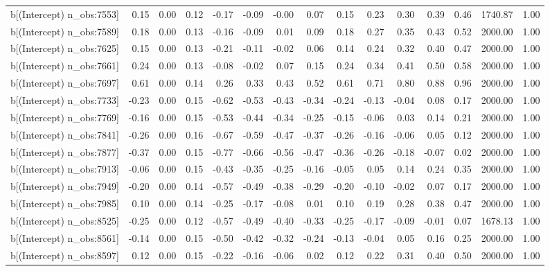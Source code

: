 \begin{table}[ht]
\begin{tabular}{rrrrrrrrrrrrrrr}
  b[(Intercept) n\_obs:7553] & 0.15 & 0.00 & 0.12 & -0.17 & -0.09 & -0.00 & 0.07 & 0.15 & 0.23 & 0.30 & 0.39 & 0.46 & 1740.87 & 1.00 \\ 
  b[(Intercept) n\_obs:7589] & 0.18 & 0.00 & 0.13 & -0.16 & -0.09 & 0.01 & 0.09 & 0.18 & 0.27 & 0.35 & 0.43 & 0.52 & 2000.00 & 1.00 \\ 
  b[(Intercept) n\_obs:7625] & 0.15 & 0.00 & 0.13 & -0.21 & -0.11 & -0.02 & 0.06 & 0.14 & 0.24 & 0.32 & 0.40 & 0.47 & 2000.00 & 1.00 \\ 
  b[(Intercept) n\_obs:7661] & 0.24 & 0.00 & 0.13 & -0.08 & -0.02 & 0.07 & 0.15 & 0.24 & 0.34 & 0.41 & 0.50 & 0.58 & 2000.00 & 1.00 \\ 
  b[(Intercept) n\_obs:7697] & 0.61 & 0.00 & 0.14 & 0.26 & 0.33 & 0.43 & 0.52 & 0.61 & 0.71 & 0.80 & 0.88 & 0.96 & 2000.00 & 1.00 \\ 
  b[(Intercept) n\_obs:7733] & -0.23 & 0.00 & 0.15 & -0.62 & -0.53 & -0.43 & -0.34 & -0.24 & -0.13 & -0.04 & 0.08 & 0.17 & 2000.00 & 1.00 \\ 
  b[(Intercept) n\_obs:7769] & -0.16 & 0.00 & 0.15 & -0.53 & -0.44 & -0.34 & -0.25 & -0.15 & -0.06 & 0.03 & 0.14 & 0.21 & 2000.00 & 1.00 \\ 
  b[(Intercept) n\_obs:7841] & -0.26 & 0.00 & 0.16 & -0.67 & -0.59 & -0.47 & -0.37 & -0.26 & -0.16 & -0.06 & 0.05 & 0.12 & 2000.00 & 1.00 \\ 
  b[(Intercept) n\_obs:7877] & -0.37 & 0.00 & 0.15 & -0.77 & -0.66 & -0.56 & -0.47 & -0.36 & -0.26 & -0.18 & -0.07 & 0.02 & 2000.00 & 1.00 \\ 
  b[(Intercept) n\_obs:7913] & -0.06 & 0.00 & 0.15 & -0.43 & -0.35 & -0.25 & -0.16 & -0.05 & 0.05 & 0.14 & 0.24 & 0.35 & 2000.00 & 1.00 \\ 
  b[(Intercept) n\_obs:7949] & -0.20 & 0.00 & 0.14 & -0.57 & -0.49 & -0.38 & -0.29 & -0.20 & -0.10 & -0.02 & 0.07 & 0.17 & 2000.00 & 1.00 \\ 
  b[(Intercept) n\_obs:7985] & 0.10 & 0.00 & 0.14 & -0.25 & -0.17 & -0.08 & 0.01 & 0.10 & 0.19 & 0.28 & 0.38 & 0.47 & 2000.00 & 1.00 \\ 
  b[(Intercept) n\_obs:8525] & -0.25 & 0.00 & 0.12 & -0.57 & -0.49 & -0.40 & -0.33 & -0.25 & -0.17 & -0.09 & -0.01 & 0.07 & 1678.13 & 1.00 \\ 
  b[(Intercept) n\_obs:8561] & -0.14 & 0.00 & 0.15 & -0.50 & -0.42 & -0.32 & -0.24 & -0.13 & -0.04 & 0.05 & 0.16 & 0.25 & 2000.00 & 1.00 \\ 
  b[(Intercept) n\_obs:8597] & 0.12 & 0.00 & 0.15 & -0.22 & -0.16 & -0.06 & 0.02 & 0.12 & 0.22 & 0.31 & 0.40 & 0.50 & 2000.00 & 1.00 \\ 

\end{tabular}
\end{table}
